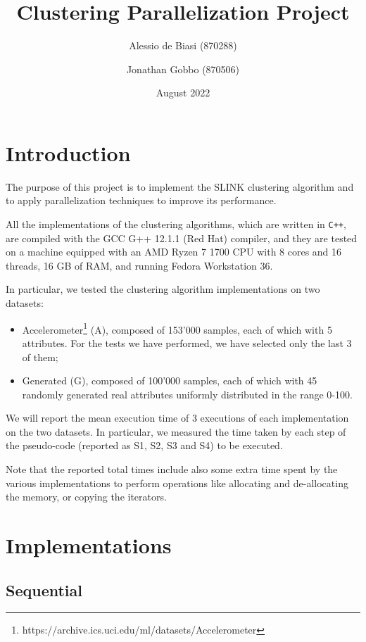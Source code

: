 \documentclass{article}
\title{Clustering Parallelization Project}
\author{Alessio de Biasi (870288) \and Jonathan Gobbo (870506)}
\date{August 2022}
\begin{document}
\twocolumn
\maketitle

\section{Introduction}

The purpose of this project is to implement the SLINK clustering algorithm and to apply parallelization techniques to improve its performance.

All the implementations of the clustering algorithms, which are written in \texttt{C++}, are compiled with the GCC G++ 12.1.1 (Red Hat) compiler, and they are tested on a machine equipped with an AMD Ryzen 7 1700 CPU with 8 cores and 16 threads, 16 GB of RAM, and running Fedora Workstation 36.

In particular, we tested the clustering algorithm implementations on two datasets:
\begin{itemize}
    \item Accelerometer\footnote{https://archive.ics.uci.edu/ml/datasets/Accelerometer} (A), composed of 153'000 samples, each of which with 5 attributes. For the tests we have performed, we have selected only the last 3 of them;
    \item Generated (G), composed of 100'000 samples, each of which with 45 randomly generated real attributes uniformly distributed in the range 0-100.
\end{itemize}

We will report the mean execution time of 3 executions of each implementation on the two datasets.
In particular, we measured the time taken by each step of the pseudo-code (reported as S1, S2, S3 and S4) to be executed.

Note that the reported total times include also some extra time spent by the various implementations to perform operations like allocating and de-allocating the memory, or copying the iterators.


\hypertarget{implementations}{
    \section{Implementations}
    \label{implementations}}

\hypertarget{sequential}{
    \subsection{Sequential}
    \label{sequential}}
\end{document}
